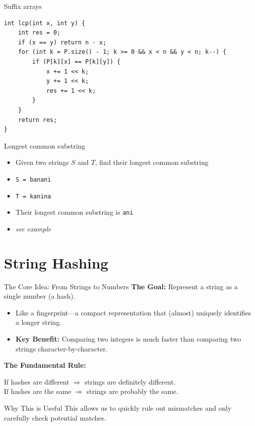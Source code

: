 \documentclass{beamer}
\begin{document}
\begin{frame}[fragile]{Suffix arrays}
	\begin{verbatim}
int lcp(int x, int y) {
	int res = 0;
	if (x == y) return n - x;
	for (int k = P.size() - 1; k >= 0 && x < n && y < n; k--) {
		if (P[k][x] == P[k][y]) {
			x += 1 << k;
			y += 1 << k;
			res += 1 << k;
		}
	}
	return res;
}
	\end{verbatim}
\end{frame}

\begin{frame}{Longest common substring}
	\begin{itemize}
		\item Given two strings $S$ and $T$, find their longest common substring
		\vspace{10pt}
		\item \texttt{S = banani}
		\item \texttt{T = kanina}
		\vspace{10pt}
		\item Their longest common substring is \texttt{ani}
		\vspace{20pt}
		\item \textit{see example}
	\end{itemize}
\end{frame}

\section*{String Hashing}

\begin{frame}{The Core Idea: From Strings to Numbers}
    \textbf{The Goal:} Represent a string as a single number (a \alert{hash}).

    \begin{itemize}
        \item Like a \alert{fingerprint}—a compact representation that (almost) uniquely identifies a longer string.
        \item \textbf{Key Benefit:} Comparing two integers is \alert{much faster} than comparing two strings character-by-character.
    \end{itemize}

    \vspace{5pt}
    \textbf{The Fundamental Rule:}
    \begin{center}
        If \alert{hashes are different} $\Rightarrow$ strings are \alert{definitely different}.\\
        If \alert{hashes are the same} $\Rightarrow$ strings are \alert{probably the same}.
    \end{center}

    \vspace{5pt}
    \begin{block}{Why This is Useful}
        This allows us to quickly \alert{rule out} mismatches and only carefully check potential matches.
    \end{block}
\end{frame}
\end{document}
